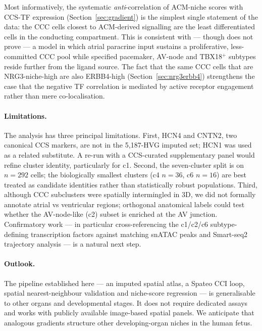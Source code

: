 \documentclass[11pt,a4paper]{article}
\begin{document}
Most informatively, the systematic \emph{anti}-correlation of
ACM-niche scores with CCS-TF expression
(Section~\ref{sec:gradient}) is the simplest single statement of the
data: the CCC cells closest to ACM-derived signalling are the least
differentiated cells in the conducting compartment. This is consistent
with --- though does not prove --- a model in which atrial paracrine
input sustains a proliferative, less-committed CCC pool while
specified pacemaker, AV-node and TBX18$^+$ subtypes reside further
from the ligand source. The fact that the same CCC cells that are
NRG3-niche-high are also ERBB4-high (Section~\ref{sec:nrg3erbb4})
strengthens the case that the negative TF correlation is mediated by
active receptor engagement rather than mere co-localisation.

\paragraph{Limitations.} The analysis has three principal limitations.
First, HCN4 and CNTN2, two canonical CCS markers, are not in the
5{,}187-HVG imputed set; HCN1 was used as a related substitute. A
re-run with a CCS-curated supplementary panel would refine cluster
identity, particularly for c1. Second, the seven-cluster split is on
$n{=}292$ cells; the biologically smallest clusters (c4 $n{=}36$, c6
$n{=}16$) are best treated as candidate identities rather than
statistically robust populations. Third, although CCC subclusters were
spatially intermingled in 3D, we did not formally annotate atrial vs
ventricular regions; orthogonal anatomical labels could test whether
the AV-node-like (c2) subset is enriched at the AV junction.
Confirmatory work --- in particular cross-referencing the c1/c2/c6
subtype-defining transcription factors against matching snATAC peaks
and Smart-seq2 trajectory analysis --- is a natural next step.

\paragraph{Outlook.} The pipeline established here --- an imputed
spatial atlas, a Spateo CCI loop, spatial nearest-neighbour validation
and niche-score regression --- is generalisable to other organs and
developmental stages. It does not require dedicated assays and works
with publicly available image-based spatial panels. We anticipate that
analogous gradients structure other developing-organ niches in the
human fetus.

\end{document}
